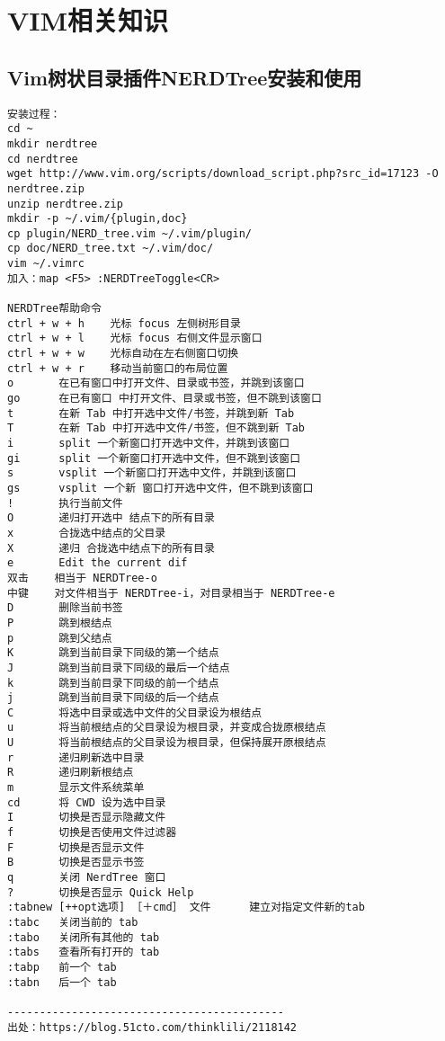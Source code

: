 \documentclass[a4paper,fontset=fandol,zihao=-4,linespread=1.2,oneside]{ctexbook}
\begin{document}
\chapter{VIM相关知识}
\section{Vim树状目录插件NERDTree安装和使用}
\begin{lstlisting}
安装过程：
cd ~
mkdir nerdtree
cd nerdtree
wget http://www.vim.org/scripts/download_script.php?src_id=17123 -O nerdtree.zip 
unzip nerdtree.zip
mkdir -p ~/.vim/{plugin,doc}
cp plugin/NERD_tree.vim ~/.vim/plugin/
cp doc/NERD_tree.txt ~/.vim/doc/
vim ~/.vimrc
加入：map <F5> :NERDTreeToggle<CR>

NERDTree帮助命令
ctrl + w + h    光标 focus 左侧树形目录
ctrl + w + l    光标 focus 右侧文件显示窗口
ctrl + w + w    光标自动在左右侧窗口切换
ctrl + w + r    移动当前窗口的布局位置
o       在已有窗口中打开文件、目录或书签，并跳到该窗口
go      在已有窗口 中打开文件、目录或书签，但不跳到该窗口
t       在新 Tab 中打开选中文件/书签，并跳到新 Tab
T       在新 Tab 中打开选中文件/书签，但不跳到新 Tab
i       split 一个新窗口打开选中文件，并跳到该窗口
gi      split 一个新窗口打开选中文件，但不跳到该窗口
s       vsplit 一个新窗口打开选中文件，并跳到该窗口
gs      vsplit 一个新 窗口打开选中文件，但不跳到该窗口
!       执行当前文件
O       递归打开选中 结点下的所有目录
x       合拢选中结点的父目录
X       递归 合拢选中结点下的所有目录
e       Edit the current dif
双击    相当于 NERDTree-o
中键    对文件相当于 NERDTree-i，对目录相当于 NERDTree-e
D       删除当前书签
P       跳到根结点
p       跳到父结点
K       跳到当前目录下同级的第一个结点
J       跳到当前目录下同级的最后一个结点
k       跳到当前目录下同级的前一个结点
j       跳到当前目录下同级的后一个结点
C       将选中目录或选中文件的父目录设为根结点
u       将当前根结点的父目录设为根目录，并变成合拢原根结点
U       将当前根结点的父目录设为根目录，但保持展开原根结点
r       递归刷新选中目录
R       递归刷新根结点
m       显示文件系统菜单
cd      将 CWD 设为选中目录
I       切换是否显示隐藏文件
f       切换是否使用文件过滤器
F       切换是否显示文件
B       切换是否显示书签
q       关闭 NerdTree 窗口
?       切换是否显示 Quick Help
:tabnew [++opt选项] ［＋cmd］ 文件      建立对指定文件新的tab
:tabc   关闭当前的 tab
:tabo   关闭所有其他的 tab
:tabs   查看所有打开的 tab
:tabp   前一个 tab
:tabn   后一个 tab

-------------------------------------------
出处：https://blog.51cto.com/thinklili/2118142
\end{lstlisting}
\end{document}
